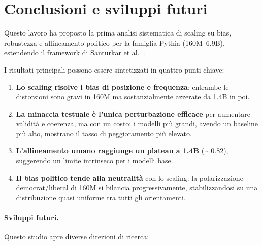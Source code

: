 \documentclass[../relazione.tex]{subfiles}
\begin{document}
\section{Conclusioni e sviluppi futuri}

Questo lavoro ha proposto la prima analisi sistematica di scaling su bias, robustezza e allineamento politico per la famiglia Pythia (160M--6.9B), estendendo il framework di Santurkar et al.\ \cite{santurkar2023whose}.

I risultati principali possono essere sintetizzati in quattro punti chiave:
\begin{enumerate}
    \item \textbf{Lo scaling risolve i bias di posizione e frequenza}: entrambe le distorsioni sono gravi in 160M ma sostanzialmente azzerate da 1.4B in poi.
    \item \textbf{La minaccia testuale è l'unica perturbazione efficace} per aumentare validità e coerenza, ma con un costo: i modelli più grandi, avendo un baseline più alto, mostrano il tasso di peggioramento più elevato.
    \item \textbf{L'allineamento umano raggiunge un plateau a 1.4B} ($\sim$\,0.82), suggerendo un limite intrinseco per i modelli base.
    \item \textbf{Il bias politico tende alla neutralità} con lo scaling: la polarizzazione democrat/liberal di 160M si bilancia progressivamente, stabilizzandosi su una distribuzione quasi uniforme tra tutti gli orientamenti.
\end{enumerate}

\paragraph{Sviluppi futuri.}
Questo studio apre diverse direzioni di ricerca:
\end{document}

